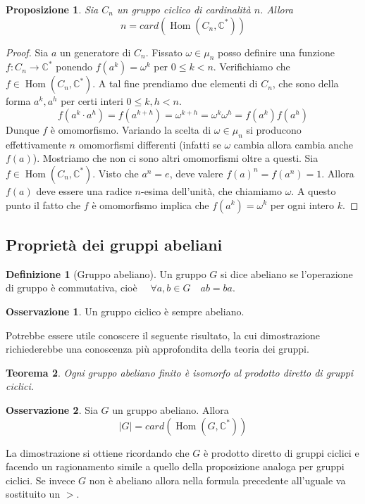 \documentclass[11pt]{article}
\theoremstyle{plain}
\newtheorem{thm}{Teorema}[section]
\newtheorem{prop}[thm]{Proposizione}
\theoremstyle{definition}
\newtheorem{defn}{Definizione}[section]
\newtheorem*{rem}{Osservazione}
\theoremstyle{remark}
\newcommand{\C}{\mathbb{C}}
\DeclareMathOperator{\Hom}{Hom}
\begin{document}
\begin{prop} Sia $C_n$ un gruppo ciclico di cardinalità $n$. Allora
\[ n = card(\Hom(C_n,\C^*))\]
\end{prop}
\begin{proof} Sia $a$ un generatore di $C_n$. Fissato $\omega\in\mu_n$ posso definire
una funzione $f:C_n\to\C^*$ ponendo $f(a^k) = \omega^k$ per $0\le k < n$.
Verifichiamo che $f\in \Hom(C_n, \C^*)$. A tal fine prendiamo due elementi di $C_n$, che sono della forma $a^k, a^h$ per certi interi $0\le k,h < n$.
\[f(a^k \cdot a^h) = f(a^{k+h}) = \omega^{k+h} = \omega^k \omega^h = f(a^k)f(a^h)\]
Dunque $f$ è omomorfismo. Variando la scelta di $\omega\in\mu_n$ si producono effettivamente $n$ omomorfismi differenti (infatti se $\omega$ cambia allora cambia anche $f(a)$).
Mostriamo che non ci sono altri omomorfismi oltre a questi.
Sia $f\in \Hom(C_n,\C^*)$. Visto che $a^n=e$, deve valere $f(a)^n = f(a^n) = 1$. Allora $f(a)$ deve essere una radice $n$-esima
dell'unità, che chiamiamo $\omega$. A questo punto il fatto che $f$ è omomorfismo implica che $f(a^k) = \omega^k$ per ogni intero $k$.
\end{proof}


\subsection{Proprietà dei gruppi abeliani}
\begin{defn}[Gruppo abeliano] Un gruppo $G$ si dice abeliano se l'operazione di gruppo è commutativa, cioè $\quad\forall a,b\in G\quad ab=ba$.
\end{defn}

\begin{rem} Un gruppo ciclico è sempre abeliano.
\end{rem}

Potrebbe essere utile conoscere il seguente risultato, la cui dimostrazione richiederebbe una conoscenza più approfondita della teoria dei gruppi.
\begin{thm}Ogni gruppo abeliano finito è isomorfo al prodotto diretto di gruppi ciclici.
\end{thm}

\begin{rem} Sia $G$ un gruppo abeliano. Allora 
\[ |G| = card(\Hom(G,\C^*))\]

La dimostrazione si ottiene ricordando che $G$ è prodotto diretto di gruppi ciclici e facendo un ragionamento simile a quello
della proposizione analoga per gruppi ciclici.
Se invece $G$ non è abeliano allora nella formula precedente all'uguale va sostituito un $>$.
\end{rem}
\end{document}
